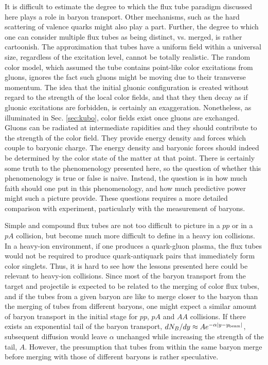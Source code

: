\documentclass[aps, prc, 12pt, nofootinbib, showpacs, superscriptaddress, tightenlines, groupedaddress]{revtex4-2}
\begin{document}
It is difficult to estimate the degree to which the flux tube paradigm discussed here plays a role in baryon transport. Other mechanisms, such as the hard scattering of valence quarks might also play a part. Further, the degree to which one can consider multiple flux tubes as being distinct, vs. merged, is rather cartoonish. The approximation that tubes have a uniform field within a universal size, regardless of the excitation level, cannot be totally realistic. The random color model, which assumed the tube contains point-like color excitations from gluons, ignores the fact such gluons might be moving due to their transverse momentum. The idea that the initial gluonic configuration is created without regard to the strength of the local color fields, and that they then decay as if gluonic excitations are forbidden, is certainly an exaggeration.  Nonetheless, as illuminated in Sec. \ref{sec:kubo}, color fields exist once gluons are exchanged. Gluons can be radiated at intermediate rapidities and they should contribute to the strength of the color field. They provide energy density and forces which couple to baryonic charge. The energy density and baryonic forces should indeed be determined by the color state of the matter at that point. There is certainly some truth to the phenomenology presented here, so the question of whether this phenomenology is true or false is naive. Instead, the question is in how much faith should one put in this phenomenology, and how much predictive power might such a picture provide. These questions requires a more detailed comparison with experiment, particularly with the measurement of baryons. 

Simple and compound flux tubes are not too difficult to picture in a $pp$ or in a $pA$ collision, but become much more difficult to define in a heavy ion collisions. In a heavy-ion environment, if one produces a quark-gluon plasma, the flux tubes would not be required to produce quark-antiquark pairs that immediately form color singlets. Thus, it is hard to see how the lessons presented here could be relevant to heavy-ion collisions. Since most of the baryon transport from the target and projectile is expected to be related to the merging of color flux tubes, and if the tubes from a given baryon are like to merge closer to the baryon than the merging of tubes from different baryons, one might expect a similar amount of baryon transport in the initial stage for $pp$, $pA$ and $AA$ collisions. If there exists an exponential tail of the baryon transport, $dN_B/dy \approx Ae^{-\alpha|y-y_{\rm beam}|}$, subsequent diffusion would leave $\alpha$ unchanged while increasing the strength of the tail, $A$. However, the presumption that tubes from within the same baryon merge before merging with those of different baryons is rather speculative. 
\end{document}
